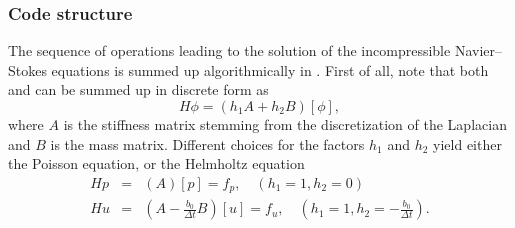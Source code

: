 \documentclass{sig-alternate}
\begin{document}
\subsubsection{Code structure}
\label{sec:code}

The sequence of operations leading to the solution of the incompressible
Navier--Stokes equations is summed up algorithmically in .  
First of all, note that both  and  can be summed up in discrete form as
$$H \phi=(h_1 A+h_2 B)[\phi],$$
where $A$ is the stiffness matrix stemming from the discretization of the Laplacian and $B$ is the mass matrix. 
Different choices for the factors $h_1$ and $h_2$ yield either the Poisson equation, or the Helmholtz equation
\begin{eqnarray}
Hp &=& (A)[p]=f_p, \quad (h_1=1, h_2=0)\\
Hu &=&(A -\frac{b_0}{\Delta t} B )[u]=f_u, \quad (h_1=1, h_2=-\frac{b_0}{\Delta t}).
\end{eqnarray}
\end{document}
